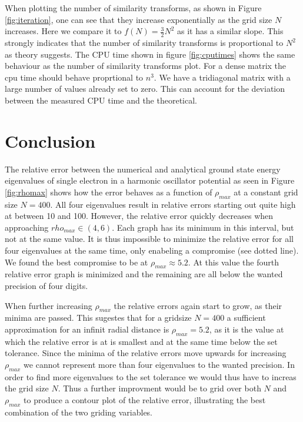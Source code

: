 \documentclass[twocolumn]{aastex62}
\begin{document}
When plotting the number of similarity transforms, as shown in Figure \ref{fig:iteration}, one can see that they increase exponentially as the grid size $N$ increases. Here we compare it to $f(N) =\frac{3}{2}N^2$ as it has a similar slope. This strongly indicates that the number of similarity transforms is proportional to $N^2$ as theory suggests. The CPU time shown in figure \ref{fig:cputimes} shows the same behaviour as the number of similarity transforms plot. For a dense matrix the cpu time should behave proprtional to $n^3$. We have a tridiagonal matrix with a large number of values already set to zero. This can account for the deviation between the measured CPU time and the theoretical.  


\section{Conclusion} \label{sec:conclusion}
The relative error between the numerical and analytical ground state energy eigenvalues of single electron in a harmonic oscillator potential as seen in Figure \ref{fig:rhomax} shows how the error behaves as a function of $\rho_{max}$ at a constant grid size $N = 400$. All four eigenvalues result in relative errors starting out quite high at between 10 and 100. However, the relative error quickly decreases when approaching $rho_{max}\in(4,6)$. Each graph has its minimum in this interval, but not at the same value. It is thus impossible to minimize the relative error for all four eigenvalues at the same time, only enabeling a compromise (see dotted line). We found the best compromise to be at $\rho_{max}\approx 5.2$. At this value the fourth relative error graph is minimized and the remaining are all below the wanted precision of four digits. 

When further increasing $\rho_{max}$ the relative errors again start to grow, as their minima are passed. This sugestes that for a gridsize $N = 400$ a sufficient approximation for an infinit radial distance is $\rho_{max} = 5.2$, as it is the value at which the relative error is at is smallest and at the same time below the set tolerance. Since the minima of the relative errors move upwards for increasing $\rho_{max}$ we cannot represent more than four eigenvalues to the wanted precision. In order to find more eigenvalues to the set tolerance we would thus have to increas the grid size $N$. Thus a further improvment would be to grid over both $N$ and $\rho_{max}$ to produce a contour plot of the relative error, illustrating the best combination of the two griding variables.
\end{document}

